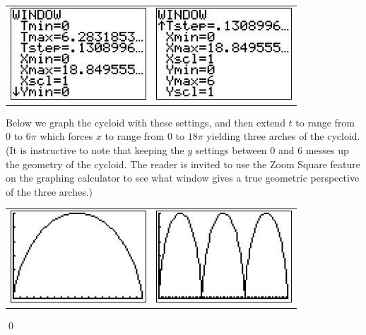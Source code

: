 \begin{ex}
\begin{center}
\begin{tabular}{cc}

\includegraphics[width=2in]{./AppExtGraphics/Parametric03.jpg} &
\hspace{0.75in} \includegraphics[width=2in]{./AppExtGraphics/Parametric04.jpg} \\

\end{tabular} 


\end{center}


Below we graph the cycloid with these settings, and then extend $t$ to range from $0$ to $6\pi$ which forces $x$ to range from $0$ to $18\pi$ yielding three arches of the cycloid.  (It is instructive to note that keeping the $y$ settings between 0 and 6 messes up the geometry of the cycloid.  The reader is invited to use the Zoom Square feature on the graphing calculator to see what window gives a true geometric perspective of the three arches.)

\begin{center}

\begin{tabular}{cc}

\includegraphics[width=2in]{./AppExtGraphics/Parametric05.jpg} &
\hspace{0.75in} \includegraphics[width=2in]{./AppExtGraphics/Parametric06.jpg} \\


\end{tabular} 
\end{center}

\qed
\end{ex}



